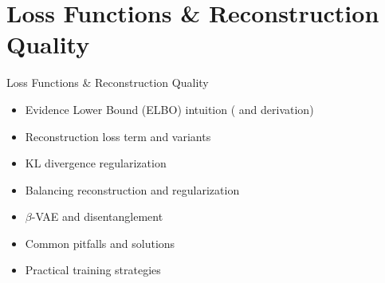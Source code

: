 \documentclass[5pt,aspectratio=169]{beamer}
\begin{document}



\section{Loss Functions \& Reconstruction Quality}

\begin{frame}{Loss Functions \& Reconstruction Quality}
\begin{itemize}
\item Evidence Lower Bound (ELBO) intuition ( and derivation)
\item Reconstruction loss term and variants
\item KL divergence regularization
\item Balancing reconstruction and regularization
\item $\beta$-VAE and disentanglement
\item Common pitfalls and solutions
\item Practical training strategies
\end{itemize}

\begin{center}
\end{center}
\end{frame}
\end{document}
